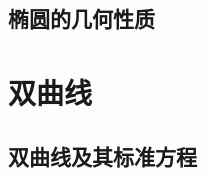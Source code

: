 \subsection{椭圆的几何性质}
\begin{Practice}
  \begin{question}
    \item 
    \item 
    \item 
  \end{question}
\end{Practice}
\begin{Exercise}
  \begin{question}
    \item 
    \item 
    \item 
    \item 
    \item 
    \item 
    \item 
    \item 
    \item 
    \item 
    \item 
    \item 
    \item 
    \item 
  \end{question}
\end{Exercise}
\section{双曲线}
\subsection{双曲线及其标准方程}
\begin{Practice}
  \begin{question}
    \item 
    \item 
  \end{question}
\end{Practice}
